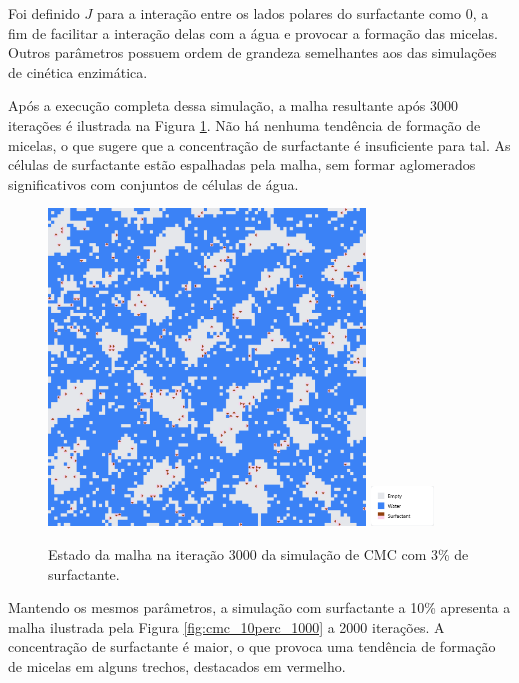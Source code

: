 \documentclass[12pt,oneside]{report}
\begin{document}
Foi definido $J$ para a interação entre os lados polares do surfactante como 0, a fim de facilitar a interação delas com a água e provocar a formação das micelas. Outros parâmetros possuem ordem de grandeza semelhantes aos das simulações de cinética enzimática.

Após a execução completa dessa simulação, a malha resultante após 3000 iterações é ilustrada na Figura \ref{fig:cmc_3perc}. Não há nenhuma tendência de formação de micelas, o que sugere que a concentração de surfactante é insuficiente para tal. As células de surfactante estão espalhadas pela malha, sem formar aglomerados significativos com conjuntos de células de água.

\begin{figure}[H]
    \centering
    \includegraphics[width=0.75\textwidth]{img/cmc_3perc_3000.png}
    \hspace{0.05\textwidth}
    \includegraphics[width=0.15\textwidth]{img/legend_cmc.png}
    \caption{\small Estado da malha na iteração 3000 da simulação de CMC com 3\% de surfactante.}
    \label{fig:cmc_3perc}
\end{figure}

Mantendo os mesmos parâmetros, a simulação com surfactante a 10\% apresenta a malha ilustrada pela Figura \ref{fig:cmc_10perc_1000} a 2000 iterações. A concentração de surfactante é maior, o que provoca uma tendência de formação de micelas em alguns trechos, destacados em vermelho.
\end{document}
